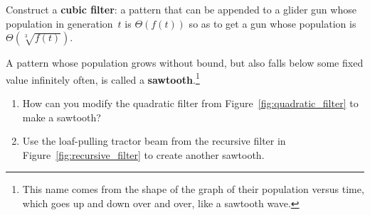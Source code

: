 \begin{multicols}{2}
\begin{problem}
	\end{problem}
	
	
	\mfilbreak
	
	
	\begin{problem}\label{exer:cubic_filter} 
		Construct a \textbf{cubic filter}: a pattern that can be appended to a glider gun whose population in generation~$t$ is $\Theta(f(t))$ so as to get a gun whose population is $\Theta(\sqrt[3]{f(t)})$.
	\end{problem}
	
	
	\mfilbreak
	
	
	\begin{problem}\label{exer:sawtooth} 
		A pattern whose population grows without bound, but also falls below some fixed value infinitely often, is called a \textbf{sawtooth}.\footnote{This name comes from the shape of the graph of their population versus time, which goes up and down over and over, like a sawtooth wave.}\smallskip
		
		\begin{enumerate}[label=\bf\color{ocre}(\alph*)]
			\item How can you modify the quadratic filter from Figure~\ref{fig:quadratic_filter} to make a sawtooth?
			
			\item Use the loaf-pulling tractor beam from the recursive filter in Figure~\ref{fig:recursive_filter} to create another sawtooth.
		\end{enumerate}
	\end{problem}
	
	
\end{multicols}
\normalsize\vspace*{0.01cm}
